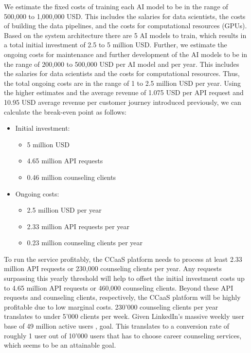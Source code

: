 We estimate the fixed costs of training each AI model to be in the range of 500,000 to 1,000,000 USD.
This includes the salaries for data scientists, the costs of building the data pipelines, and the costs
for computational resources (GPUs). Based on the system architecture there are 5 AI models to train,
which results in a total initial investment of 2.5 to 5 million USD. Further, we estimate the ongoing
costs for maintenance and further development of the AI models to be in the range of 200,000 to 500,000
USD per AI model and per year. This includes the salaries for data scientists and the costs for computational
resources. Thus, the total ongoing costs are in the range of 1 to 2.5 million USD per year. Using the higher
estimates and the average revenue of 1.075 USD per API request and 10.95 USD average revenue per customer
journey introduced previously, we can calculate the break-even point as follows:

\begin{itemize}
    \item Initial investment:
    \begin{itemize}
        \item 5 million USD
        \item 4.65 million API requests 
        \item 0.46 million counseling clients
    \end{itemize}
    
    \item Ongoing costs:
    \begin{itemize}
        \item 2.5 million USD per year
        \item 2.33 million API requests per year
        \item 0.23 million counseling clients per year
    \end{itemize}
\end{itemize}

To run the service profitably, the CCaaS platform needs to process at least 2.33 million API requests
or 230,000 counseling clients per year. Any requests surpassing this yearly threshold will help to offset
the initial investment costs up to 4.65 million API requests or 460,000 counseling clients. Beyond these
API requests and counseling clients, respectively, the CCaaS platform will be highly profitable due to 
low marginal costs. 230'000 counseling clients per year translates to under 5'000 clients per week.
Given LinkedIn's massive weekly user base of 49 million active users \citep{kaserAIpoweredCareerCounseling2023},
goal. This translates to a conversion rate of roughly 1 user out of 10'000 users that has to choose career
counseling services, which seems to be an attainable goal.


